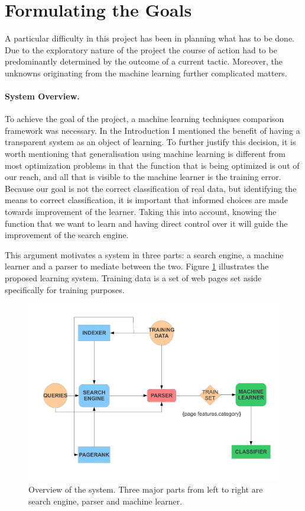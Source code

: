 \documentclass[12pt,twoside,notitlepage]{report}
\begin{document}
\section{Formulating the Goals}
A particular difficulty in this project has been in planning what has to be
done. Due to the exploratory nature of the project the course of action had to
be predominantly determined by the outcome of a current tactic. Moreover, the
unknowns originating from the machine learning further complicated matters. 

\paragraph{System Overview.}

To achieve the goal of the project, a machine learning techniques comparison
framework was necessary. In the Introduction I mentioned the benefit of having
a transparent system as an object of learning. To further justify this
decision, it is worth mentioning that  generalisation using machine learning is
different from most optimization problems in that the function that is being
optimized is out of our reach, and all that is visible to the machine learner
is the training error. Because our goal is not the correct classification of
real data, but identifying the means to correct classification, it is important
that informed choices are made towards improvement of the learner. Taking this
into account, knowing the function that we want to learn and having direct
control over it  will guide the improvement of the search engine. 

This argument motivates a system in three parts: a search engine, a machine
learner and a parser to mediate between the two.  Figure \ref{overview}
illustrates the proposed learning system. Training data is a set of web pages
set aside specifically for training purposes.  

\begin{figure}
\centering
\includegraphics[scale=0.5]{figs/overview.pdf}
\caption{Overview of the system. Three major parts from left to right are search engine,
parser and machine learner.}
\label{overview}
\end{figure}
\end{document}
